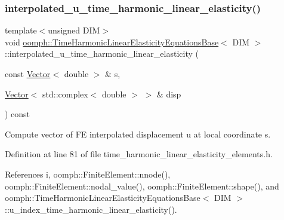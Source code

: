 \subsubsection{\texorpdfstring{interpolated\+\_\+u\+\_\+time\+\_\+harmonic\+\_\+linear\+\_\+elasticity()}{interpolated\_u\_time\_harmonic\_linear\_elasticity()}\hspace{0.1cm}{\footnotesize\ttfamily [1/2]}}
{\footnotesize\ttfamily template$<$unsigned D\+IM$>$ \\
void \hyperlink{classoomph_1_1TimeHarmonicLinearElasticityEquationsBase}{oomph\+::\+Time\+Harmonic\+Linear\+Elasticity\+Equations\+Base}$<$ D\+IM $>$\+::interpolated\+\_\+u\+\_\+time\+\_\+harmonic\+\_\+linear\+\_\+elasticity (\begin{DoxyParamCaption}\item[{const \hyperlink{classoomph_1_1Vector}{Vector}$<$ double $>$ \&}]{s,  }\item[{\hyperlink{classoomph_1_1Vector}{Vector}$<$ std\+::complex$<$ double $>$ $>$ \&}]{disp }\end{DoxyParamCaption}) const\hspace{0.3cm}{\ttfamily [inline]}}



Compute vector of FE interpolated displacement u at local coordinate s. 



Definition at line 81 of file time\+\_\+harmonic\+\_\+linear\+\_\+elasticity\+\_\+elements.\+h.



References i, oomph\+::\+Finite\+Element\+::nnode(), oomph\+::\+Finite\+Element\+::nodal\+\_\+value(), oomph\+::\+Finite\+Element\+::shape(), and oomph\+::\+Time\+Harmonic\+Linear\+Elasticity\+Equations\+Base$<$ D\+I\+M $>$\+::u\+\_\+index\+\_\+time\+\_\+harmonic\+\_\+linear\+\_\+elasticity().

\mbox{\label{classoomph_1_1TimeHarmonicLinearElasticityEquationsBase_ab2d96120b64ae6c92a115a64fe421241}} 
